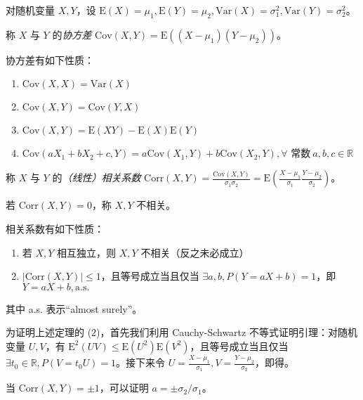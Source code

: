\documentclass[../main.tex]{subfiles}
\begin{document}
对随机变量 $X,Y$，设 $\mathrm E(X)=\mu_1,\mathrm E(Y)=\mu_2,\mathrm{Var}(X)=\sigma_1^2,\mathrm{Var}(Y)=\sigma_2^2$。

\begin{definition}\label{def:4.4.1}
    称 $X$ 与 $Y$ 的\emph{协方差} $\mathrm{Cov}(X,Y)=\mathrm E((X-\mu_1)(Y-\mu_2))$。
\end{definition}

\begin{proposition}
    协方差有如下性质：
    \begin{enumerate}
        \item $\mathrm{Cov}(X,X)=\mathrm{Var}(X)$
        \item $\mathrm{Cov}(X,Y)=\mathrm{Cov}(Y,X)$
        \item $\mathrm{Cov}(X,Y)=\mathrm E(XY)-\mathrm E(X)\mathrm E(Y)$
        \item $\mathrm{Cov}(aX_1+bX_2+c,Y)=a\mathrm{Cov}(X_1,Y)+b\mathrm{Cov}(X_2,Y),\forall\text{ 常数}\ a,b,c\in\mathbb R$
    \end{enumerate}
\end{proposition}

\begin{definition}\label{def:4.4.2}
    称 $X$ 与 $Y$ 的\emph{（线性）相关系数} $\mathrm{Corr}(X,Y)=\frac{\mathrm{Cov}(X,Y)}{\sigma_1\sigma_2}=\mathrm E(\frac{X-\mu_1}{\sigma_1}\frac{Y-\mu_2}{\sigma_2})$。
\end{definition}

若 $\mathrm{Corr}(X,Y)=0$，称 $X,Y$ 不相关。

\begin{theorem}\label{thm:4.4.1}
    相关系数有如下性质：
    \begin{enumerate}
        \item 若 $X,Y$ 相互独立，则 $X,Y$ 不相关（反之未必成立）
        \item $|\mathrm{Corr}(X,Y)|\leq1$，且等号成立当且仅当 $\exists a,b,P(Y=aX+b)=1$，即 $Y=aX+b,\mathrm{a.s.}$
    \end{enumerate}
\end{theorem}

其中 a.s. 表示“almost surely”。

为证明上述定理的 (2)，首先我们利用 Cauchy-Schwartz 不等式证明引理：对随机变量 $U,V$，有 $\mathrm{E}^2(UV)\leq \mathrm{E}(U^2)\mathrm{E}(V^2)$，且等号成立当且仅当 $\exists t_0\in\mathbb R,P(V=t_0U)=1$。接下来令 $U=\frac{X-\mu_1}{\sigma_1},V=\frac{Y-\mu_2}{\sigma_2}$，即得。

当 $\mathrm{Corr}(X,Y)=\pm1$，可以证明 $a=\pm\sigma_2/\sigma_1$。
\end{document}
